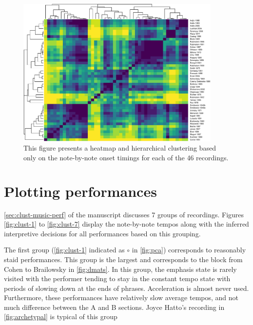 \documentclass[aoas]{imsart}
\begin{document}
\begin{figure}[b]

{\centering \includegraphics[width=4in]{gfx/raw-data-clusters-1} 

}

\caption{This figure presents a heatmap and hierarchical clustering based only on the note-by-note onset timings for each of the 46 recordings.}\label{fig:raw-data-clusters}
\end{figure}

\hypertarget{plotting-performances}{%
\section{Plotting performances}\label{plotting-performances}}

\autoref{sec:clust-music-perf} of the manuscript discusses 7 groups of
recordings. Figures \ref{fig:clust-1} to \ref{fig:clust-7} display the
note-by-note tempos along with the inferred interpretive decisions for
all performances based on this grouping.

The first group (\autoref{fig:clust-1} indicated as \(\circ\) in
\autoref{fig:pca}) corresponds to reasonably staid performances. This
group is the largest and corresponds to the block from Cohen to
Brailowsky in \autoref{fig:dmats}. In this group, the emphasis state is
rarely visited with the performer tending to stay in the constant tempo
state with periods of slowing down at the ends of phrases. Acceleration
is almost never used. Furthermore, these performances have relatively
slow average tempos, and not much difference between the A and B
sections. Joyce Hatto's recording in \autoref{fig:archetypal} is typical
of this group
\end{document}
